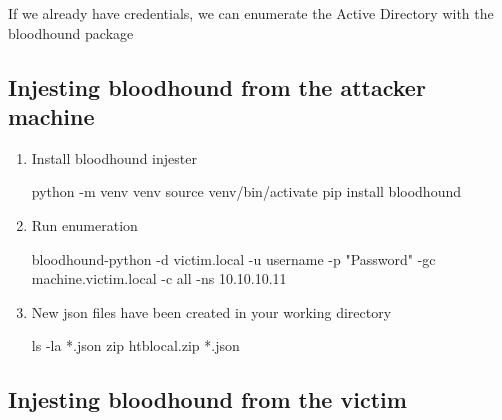 \documentclass{assets/ipesethesis}
\newenvironment{Shaded}{\begin{snugshade}}{\end{snugshade}}
\newcommand{\BuiltInTok}[1]{#1}
\newcommand{\ExtensionTok}[1]{#1}
\newcommand{\FunctionTok}[1]{\textcolor[rgb]{0.00,0.00,0.00}{#1}}
\newcommand{\NormalTok}[1]{#1}
\newcommand{\StringTok}[1]{\textcolor[rgb]{0.31,0.60,0.02}{#1}}
\begin{document}
If we already have credentials, we can enumerate the Active Directory with the bloodhound package

\hypertarget{injesting-bloodhound-from-the-attacker-machine}{%
\subsection*{Injesting bloodhound from the attacker machine}\label{injesting-bloodhound-from-the-attacker-machine}}

\begin{enumerate}
\def\labelenumi{\arabic{enumi}.}
\item
  Install bloodhound injester

\begin{Shaded}
\begin{Highlighting}[]
\ExtensionTok{python}\NormalTok{ -m venv venv}
\BuiltInTok{source}\NormalTok{ venv/bin/activate}
\ExtensionTok{pip}\NormalTok{ install bloodhound}
\end{Highlighting}
\end{Shaded}
\item
  Run enumeration

\begin{Shaded}
\begin{Highlighting}[]
\ExtensionTok{bloodhound-python}\NormalTok{ -d victim.local -u username -p }\StringTok{"Password"}\NormalTok{ -gc machine.victim.local -c all -ns 10.10.10.11}
\end{Highlighting}
\end{Shaded}
\item
  New json files have been created in your working directory

\begin{Shaded}
\begin{Highlighting}[]
\FunctionTok{ls}\NormalTok{ -la *.json}
\FunctionTok{zip}\NormalTok{ htblocal.zip *.json }
\end{Highlighting}
\end{Shaded}
\end{enumerate}

\hypertarget{injesting-bloodhound-from-the-victim}{%
\subsection*{Injesting bloodhound from the victim}\label{injesting-bloodhound-from-the-victim}}
\end{document}
